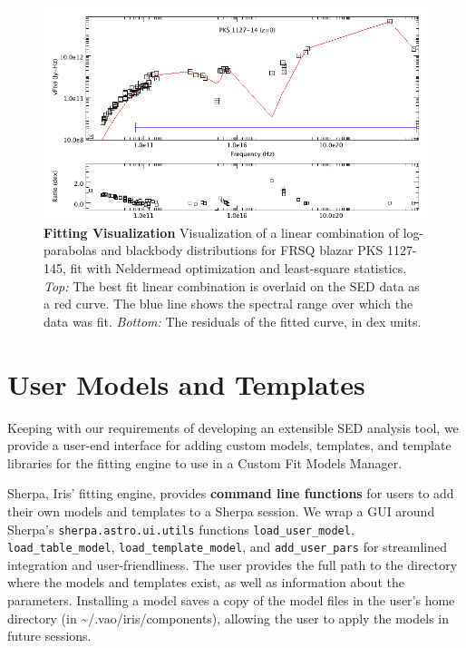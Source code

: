 \documentclass[5p]{elsarticle}
\begin{document}
\begin{figure}
\begin{center}
\includegraphics[width=\columnwidth]{figures/all-models-plot-only2.png}
\caption{\textbf{\label{fig:fitting} Fitting Visualization} Visualization of a linear combination of log-parabolas and blackbody distributions for FRSQ blazar PKS 1127-145, fit with Neldermead optimization and least-square statistics. \textit{Top:} The best fit linear combination is overlaid on the SED data as a red curve. The blue line shows the spectral range over which the data was fit. \textit{Bottom:} The residuals of the fitted curve, in dex units.}
\end{center}
\end{figure}

\section{User Models and Templates}
\label{sec:usermodels}

Keeping with our requirements of developing an extensible SED analysis tool, we provide a user-end interface for adding custom models, templates, and template libraries for the fitting engine to use in a Custom Fit Models Manager.

Sherpa, Iris' fitting engine, provides \textbf{command line functions} for users to add their own models and templates to a Sherpa session. We wrap a GUI around Sherpa's \texttt{sherpa.astro.ui.utils} functions \texttt{load\_user\_model}, \texttt{load\_table\_model}, \texttt{load\_template\_model}, and \texttt{add\_user\_pars} for streamlined integration and user-friendliness. The user provides the full path to the directory where the models and templates exist, as well as information about the parameters. Installing a model saves a copy of the model files in the user's home directory (in \~{}/.vao/iris/components), allowing the user to apply the models in future sessions.
\end{document}

